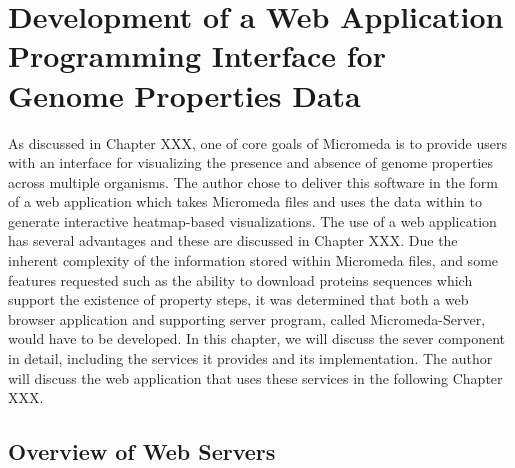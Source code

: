 \chapter{Development of a Web Application Programming Interface for Genome Properties Data}

As discussed in Chapter XXX, one of core goals of Micromeda is to provide users with an interface for visualizing the presence and absence of genome properties across multiple organisms. The author chose to deliver this software in the form of a web application which takes Micromeda files and uses the data within to generate interactive heatmap-based visualizations. The use of a web application has several advantages and these are discussed in Chapter XXX. Due the inherent complexity of the information stored within Micromeda files, and some features requested such as the ability to download proteins sequences which support the existence of property steps, it was determined that both a web browser application and supporting server program, called Micromeda-Server, would have to be developed. In this chapter, we will discuss the sever component in detail, including the services it provides and its implementation. The author will discuss the web application that uses these services in the following Chapter XXX.

\section{Overview of Web Servers}

